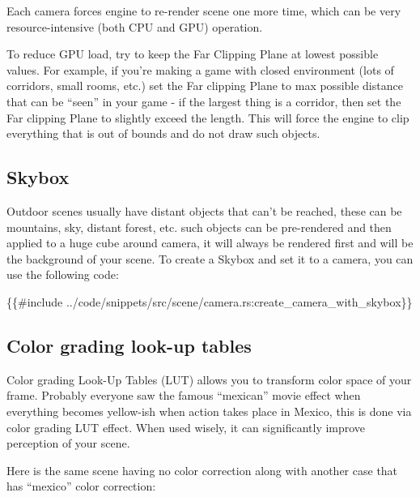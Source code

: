 \documentclass[
]{book}
\newenvironment{Shaded}{\begin{snugshade}}{\end{snugshade}}
\newcommand{\NormalTok}[1]{#1}
\theoremstyle{definition}
\theoremstyle{definition}
\theoremstyle{definition}
\theoremstyle{definition}
\theoremstyle{remark}
\begin{document}
Each camera forces engine to re-render scene one more time, which can be very resource-intensive (both CPU and GPU) operation.

To reduce GPU load, try to keep the Far Clipping Plane at lowest possible values. For example, if you're making a game with closed environment (lots of corridors, small rooms, etc.) set the Far clipping Plane to max possible distance that can be ``seen'' in your game - if the largest thing is a corridor, then set the Far clipping Plane to slightly exceed the length. This will force the engine to clip everything that is out of bounds and do not draw such objects.

\subsection{Skybox}\label{skybox}

Outdoor scenes usually have distant objects that can't be reached, these can be mountains, sky, distant forest, etc. such objects can be pre-rendered and then applied to a huge cube around camera, it will always be rendered first and will be the background of your scene. To create a Skybox and set it to a camera, you can use the following code:

\begin{Shaded}
\begin{Highlighting}[]
\NormalTok{\{\{\#include ../code/snippets/src/scene/camera.rs:create\_camera\_with\_skybox\}\}}
\end{Highlighting}
\end{Shaded}

\subsection{Color grading look-up tables}\label{color-grading-look-up-tables}

Color grading Look-Up Tables (LUT) allows you to transform color space of your frame. Probably everyone saw the famous ``mexican'' movie effect when everything becomes yellow-ish when action takes place in Mexico, this is done via color grading LUT effect. When used wisely, it can significantly improve perception of your scene.

Here is the same scene having no color correction along with another case that has ``mexico'' color correction:
\end{document}
